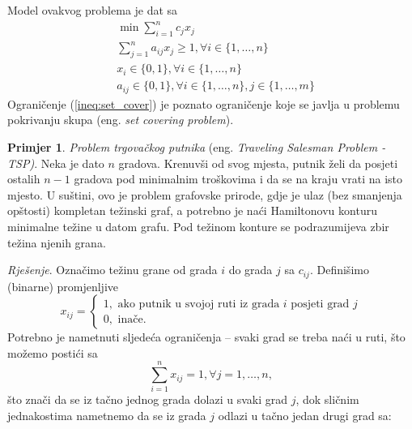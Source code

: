 \documentclass[a4paper, utf8, 11pt, colorlinks]{book}
\theoremstyle{definition}
\newtheorem{primjer}{Primjer}[chapter]
\begin{document}
Model ovakvog problema je dat sa 
\begin{align}
    &\min \sum_{i=1}^n c_j x_j \nonumber\\
    & \sum_{j=1}^n a_{ij} x_j \geq 1, \forall i \in \{1,\ldots, n\} \label{ineq:set_cover} \\
    & x_i \in \{0, 1 \}, \forall i \in \{1, \ldots, n\} \\
    & a_{ij} \in \{0, 1\}, \forall i \in \{1, \ldots, n\}, j \in\{1,\ldots, m\} \nonumber
\end{align}
Ograničenje (\ref{ineq:set_cover}) je poznato ograničenje koje se javlja u problemu pokrivanju  skupa (eng. \emph{set covering problem}).
\begin{primjer}
\emph{Problem trgovačkog putnika} (eng. \emph{Traveling Salesman Problem - TSP)}. Neka je dato $n$ gradova. Krenuvši od svog mjesta, putnik želi da posjeti ostalih $n-1$ gradova pod minimalnim troškovima i da se na kraju vrati na isto mjesto. U suštini, ovo je problem grafovske prirode, gdje je ulaz (bez smanjenja opštosti) kompletan težinski graf, a potrebno je naći Hamiltonovu konturu minimalne težine u datom grafu. Pod težinom konture se podrazumijeva zbir težina njenih grana. 
\end{primjer}
\emph{Rješenje}. Označimo težinu grane od grada $i$ do grada $j$ sa $c_{ij}$.  Definišimo (binarne) promjenljive 
$$x_{ij} = \begin{cases}
                1, \mbox{ ako putnik u svojoj ruti iz grada } i \mbox{ posjeti grad } j \\
                0, \mbox{ inače}. 
          \end{cases}$$ 
Potrebno je nametnuti sljedeća ograničenja -- svaki grad se treba naći u ruti,  što možemo postići sa 
$$  \sum_{i=1}^n x_{ij} = 1, \forall j =1,\ldots, n,$$ 
što znači da se iz tačno jednog grada dolazi u svaki grad $j$, dok sličnim jednakostima nametnemo da se iz grada $j$ odlazi u tačno jedan drugi grad sa:
\end{document}
